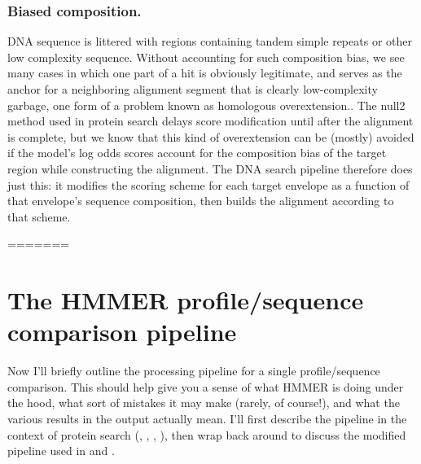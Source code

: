 \subsection{Biased composition.}

DNA sequence is littered with regions containing tandem simple repeats
or other low complexity sequence. Without accounting for such
composition bias, we see many cases in which one part of a hit is
obviously legitimate, and serves as the anchor for a neighboring
alignment segment that is clearly low-complexity garbage, one form of
a problem known as homologous overextension.\cite{Gonzalez10}. The
null2 method used in protein search delays score modification until
after the alignment is complete, but we know that this kind of
overextension can be (mostly) avoided if the model's log odds scores
account for the composition bias of the target region while
constructing the alignment. The DNA search pipeline therefore does
just this: it modifies the scoring scheme for each target envelope as
a function of that envelope's sequence composition, then builds the
alignment according to that scheme.





=======

\chapter{The HMMER profile/sequence comparison pipeline}
\label{chapter:pipeline}
\setcounter{footnote}{0}

Now I'll briefly outline the processing pipeline for a single
profile/sequence comparison. This should help
give you a sense of what HMMER is doing under the hood, what sort of
mistakes it may make (rarely, of course!), and what the various
results in the output actually mean. I'll first describe the pipeline
in the context of protein search (, ,
, ), then wrap back around to discuss
the modified pipeline used in  and .

